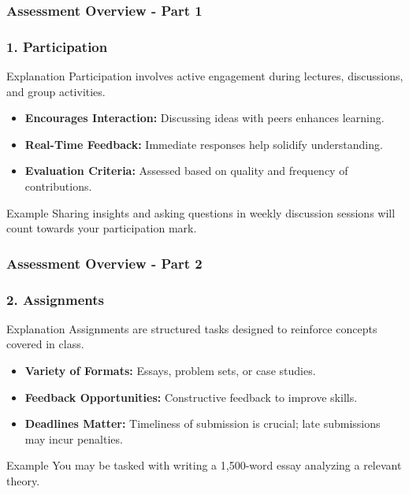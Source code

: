 \documentclass[aspectratio=169]{beamer}
\begin{document}
\begin{frame}[fragile]
    \frametitle{Assessment Overview - Part 1}
    \frametitle{1. Participation}

    \begin{block}{Explanation}
        Participation involves active engagement during lectures, discussions, and group activities.
    \end{block}

    \begin{itemize}
        \item \textbf{Encourages Interaction:} Discussing ideas with peers enhances learning.
        \item \textbf{Real-Time Feedback:} Immediate responses help solidify understanding.
        \item \textbf{Evaluation Criteria:} Assessed based on quality and frequency of contributions.
    \end{itemize}

    \begin{block}{Example}
        Sharing insights and asking questions in weekly discussion sessions will count towards your participation mark.
    \end{block}
\end{frame}

\begin{frame}[fragile]
    \frametitle{Assessment Overview - Part 2}
    \frametitle{2. Assignments}

    \begin{block}{Explanation}
        Assignments are structured tasks designed to reinforce concepts covered in class.
    \end{block}

    \begin{itemize}
        \item \textbf{Variety of Formats:} Essays, problem sets, or case studies.
        \item \textbf{Feedback Opportunities:} Constructive feedback to improve skills.
        \item \textbf{Deadlines Matter:} Timeliness of submission is crucial; late submissions may incur penalties.
    \end{itemize}

    \begin{block}{Example}
        You may be tasked with writing a 1,500-word essay analyzing a relevant theory.
    \end{block}
\end{frame}
\end{document}
